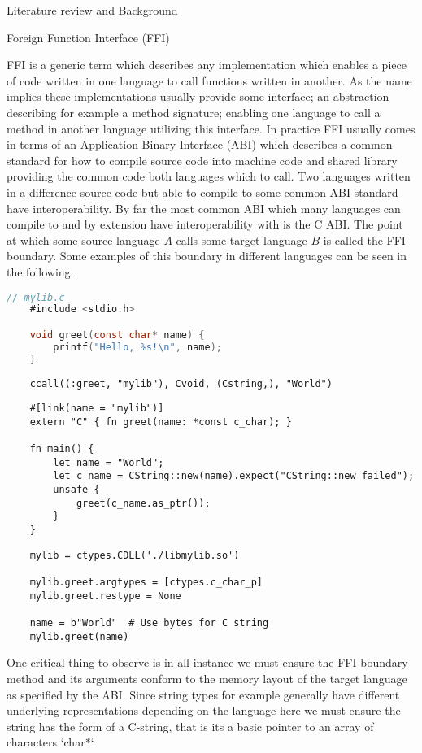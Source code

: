Literature review and Background

Foreign Function Interface (FFI)

FFI is a generic term which describes any implementation which enables a piece of code written in one language to call functions written in another. As the name implies these implementations usually provide some interface; an abstraction describing for example a method signature; enabling one language to call a method in another language utilizing this interface. In practice FFI usually comes in terms of an Application Binary Interface (ABI) which describes a common standard for how to compile source code into machine code and shared library providing the common code both languages which to call. Two languages written in a difference source code but able to compile to some common ABI standard have interoperability. By far the most common ABI which many languages can compile to and by extension have interoperability with is the C ABI. The point at which some source language $A$ calls some target language $B$ is called the FFI boundary. Some examples of this boundary in different languages can be seen in the following.
\begin{lstlisting}[language=C]
    // mylib.c
    #include <stdio.h>

    void greet(const char* name) {
        printf("Hello, %s!\n", name);
    }
\end{lstlisting}

\begin{lstlisting}
    ccall((:greet, "mylib"), Cvoid, (Cstring,), "World")
\end{lstlisting}

\begin{lstlisting}
    #[link(name = "mylib")] 
    extern "C" { fn greet(name: *const c_char); }

    fn main() { 
        let name = "World"; 
        let c_name = CString::new(name).expect("CString::new failed"); 
        unsafe { 
            greet(c_name.as_ptr()); 
        } 
    }
\end{lstlisting}

\begin{lstlisting}
    mylib = ctypes.CDLL('./libmylib.so')

    mylib.greet.argtypes = [ctypes.c_char_p]  
    mylib.greet.restype = None                  

    name = b"World"  # Use bytes for C string
    mylib.greet(name)
\end{lstlisting}
One critical thing to observe is in all instance we must ensure the FFI boundary method and its arguments conform to the memory layout of the target language as specified by the ABI. Since string types for example generally have different underlying representations depending on the language here we must ensure the string has the form of a C-string, that is its a basic pointer to an array of characters `char*`.

